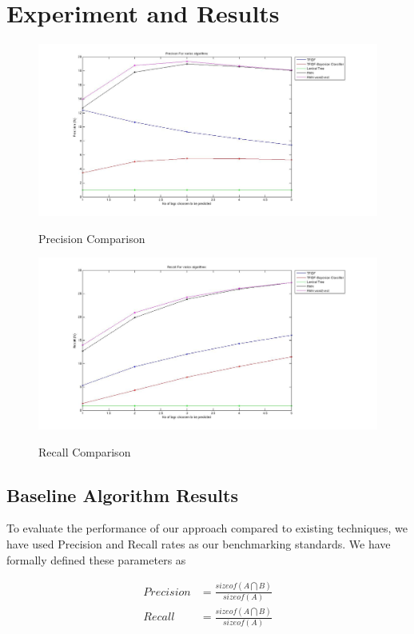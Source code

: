 \documentclass[dvips,9pt]{article}
\begin{document}
	\section{Experiment and Results}
		\begin{figure}
			\centering
			\caption{Precision Comparison}
			\includegraphics[scale=0.3]{../baseline/precision.jpg}
            \label{precision}
		\end{figure}
		\begin{figure}
			\centering
			\caption{Recall Comparison}
			\includegraphics[scale=0.3]{../baseline/recall.jpg}
            \label{recall}
		\end{figure}
		\subsection{Baseline Algorithm Results}
		
		
		To evaluate the performance of our approach compared to existing techniques, we have used Precision and Recall rates as our benchmarking standards.
		We have formally defined these parameters as 

		\begin{equation}
        \begin{aligned}
		Precision &= \frac{ sizeof(A \bigcap B)}{sizeof(A)} \\		
        Recall    &= \frac{ sizeof(A \bigcap B)}{sizeof(A)} \\
        \end{aligned}
        \end{equation}
            		
\end{document}
